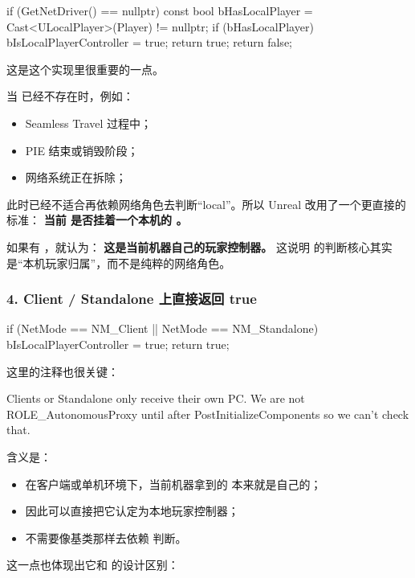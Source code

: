 \begin{code}
	if (GetNetDriver() == nullptr)
	{
		const bool bHasLocalPlayer = Cast<ULocalPlayer>(Player) != nullptr;
		if (bHasLocalPlayer)
		{
			bIsLocalPlayerController = true;
			return true;
		}
		return false;
	}
\end{code}

这是这个实现里很重要的一点。

当  已经不存在时，例如：
\begin{itemize}
	\item Seamless Travel 过程中；
	\item PIE 结束或销毁阶段；
	\item 网络系统正在拆除；
\end{itemize}

此时已经不适合再依赖网络角色去判断“local”。所以 Unreal 改用了一个更直接的标准：
\textbf{当前  是否挂着一个本机的 。}

如果有 ，就认为：
\textbf{这是当前机器自己的玩家控制器。}
这说明  的判断核心其实是“本机玩家归属”，而不是纯粹的网络角色。

\subsubsection*{4. Client / Standalone 上直接返回 true}

\begin{code}
	if (NetMode == NM_Client || NetMode == NM_Standalone)
	{
		bIsLocalPlayerController = true;
		return true;
	}
\end{code}

这里的注释也很关键：
\begin{code}
	Clients or Standalone only receive their own PC.
	We are not ROLE_AutonomousProxy until after PostInitializeComponents so we can't check that.
\end{code}

含义是：
\begin{itemize}
	\item 在客户端或单机环境下，当前机器拿到的  本来就是自己的；
	\item 因此可以直接把它认定为本地玩家控制器；
	\item 不需要像基类那样去依赖  判断。
\end{itemize}

这一点也体现出它和  的设计区别：

